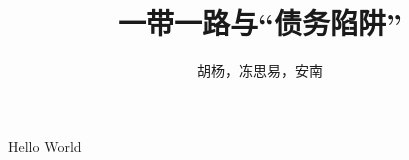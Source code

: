 \documentclass[a4paper,UTF8]{article}
\title{一带一路与“债务陷阱”}
\author{胡杨，冻思易，安南}
\begin{document}
    \maketitle
    Hello World
\end{document}
